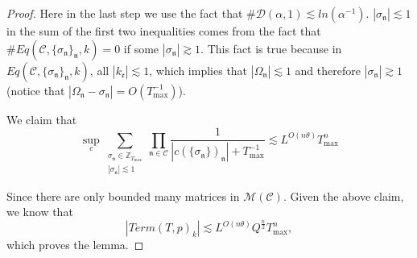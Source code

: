 \begin{proof}
Here in the last step we use the fact that $\#\mathcal{D}(\alpha,1)\lesssim ln(\alpha^{-1})$. $|\sigma_{\mathfrak{n}}|\lesssim 1$ in the sum of the first two inequalities comes from the fact that $\#Eq(\mathcal{C}, \{\sigma_{\mathfrak{n}}\}_{\mathfrak{n}},k)=0$ if some $|\sigma_{\mathfrak{n}}|\gtrsim 1$. This fact is true because in $Eq(\mathcal{C}, \{\sigma_{\mathfrak{n}}\}_{\mathfrak{n}},k)$, all $|k_{\mathfrak{e}}|\lesssim 1$, which implies that $|\Omega_{\mathfrak{n}}|\lesssim 1$ and therefore $|\sigma_{\mathfrak{n}}|\gtrsim 1$ (notice that $|\Omega_{\mathfrak{n}}-\sigma_{\mathfrak{n}}|=O(T^{-1}_{\text{max}})$).

We claim that 
\begin{equation}\label{eq.lemTpvarianceclaim.threewave}
     \sup_{c}\sum_{\substack{\sigma_{\mathfrak{n}}\in \mathbb{Z}_{T_{\text{max}}}\\ |\sigma_{\mathfrak{n}}|\lesssim 1}} \prod_{\mathfrak{n}\in \mathcal{C}}\frac{1}{|c(\{\sigma_{\mathfrak{n}}\})_{\mathfrak{n}}|+T^{-1}_{\text{max}}}\lesssim L^{O(n\theta)} T^{n}_{\text{max}}
\end{equation}

Since there are only bounded many matrices in $\mathscr{M}(\mathcal{C})$.  Given the above claim, we know that 
\begin{equation}
    |Term(T, p)_k|\lesssim L^{O(n\theta)} Q^{\frac{n}{2}} T^{n}_{\text{max}},
\end{equation}
which proves the lemma.


\end{proof}
